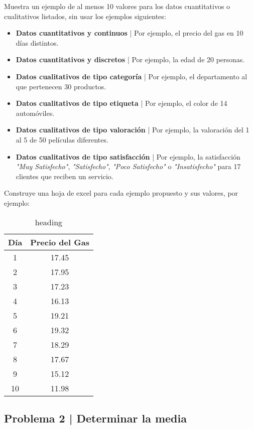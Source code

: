 \documentclass{article}
\begin{document}
Muestra un ejemplo de al menos 10 valores para los datos cuantitativos o cualitativos listados, sin usar los ejemplos siguientes:
\begin{itemize}
    \item \textbf{Datos cuantitativos y continuos} | Por ejemplo, el precio del gas en 10 días distintos.
    \item \textbf{Datos cuantitativos y discretos} | Por ejemplo, la edad de 20 personas.
    \item \textbf{Datos cualitativos de tipo categoría} | Por ejemplo, el departamento al que pertenecen 30 productos.
    \item \textbf{Datos cualitativos de tipo etiqueta} | Por ejemplo, el color de 14 automóviles.
    \item \textbf{Datos cualitativos de tipo valoración} | Por ejemplo, la valoración del 1 al 5 de 50 películas diferentes.
    \item \textbf{Datos cualitativos de tipo satisfacción} | Por ejemplo, la satisfacción \textit{"Muy Satisfecho"}, \textit{"Satisfecho"}, \textit{"Poco Satisfecho"} o \textit{"Insatisfecho"} para 17 clientes que reciben un servicio.
\end{itemize}
Construye una hoja de excel para cada ejemplo propuesto y sus valores, por ejemplo:
\begin{table}[h!]
    \centering
    \begin{tabular}{|c|c|}
    \hline
    \textbf{Día} & \textbf{Precio del Gas} \\ \hline
    1 & 17.45 \\ \hline
    2 & 17.95 \\ \hline
    3 & 17.23 \\ \hline
    4 & 16.13 \\ \hline
    5 & 19.21 \\ \hline
    6 & 19.32 \\ \hline
    7 & 18.29 \\ \hline
    8 & 17.67 \\ \hline
    9 & 15.12 \\ \hline
    10 & 11.98 \\ \hline
    \end{tabular}
    \caption{heading}
\end{table}

\subsection{Problema 2 | Determinar la media}
\end{document}
